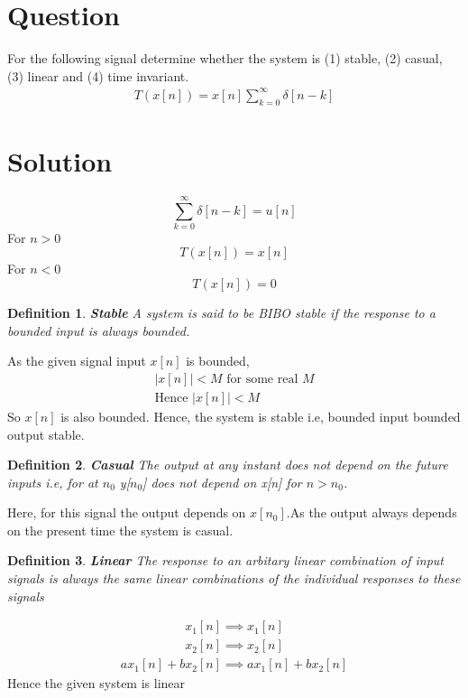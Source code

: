 \documentclass[journal,12pt,twocolumn]{IEEEtran}
\newtheorem{definition}{Definition}[section]
\begin{document}
\section{Question}
For the following signal determine whether the system is (1) stable, (2) casual, (3) linear and (4) time invariant.
\begin{align}
    T(x[n])=x[n]\sum^{\infty}_{k=0}\delta[n-k]
\end{align}
\section{Solution}
$$\sum^{\infty}_{k=0}\delta[n-k] =u[n]$$
For $n>0$ $$T(x[n])=x[n]$$
For $n<0$ $$T(x[n])=0$$
\begin{definition}{\textbf{Stable}}
A system is said to be BIBO stable if the response to a bounded input is always bounded.
\end{definition} 

As the given signal input $x[n]$ is bounded,
\begin{align}
   |x[n]| < M \text{   for some real $M$}\\
   \text{Hence  } |x[n]| < M
\end{align}
So $x[n]$ is also bounded. Hence, the system is stable i.e, bounded input bounded output stable.\\

\begin{definition}{\textbf{Casual}}
 The output at any instant does not depend on the future inputs i.e, for at $n_{0}$ y[$n_{0}$] does not depend on x[n] for $n>n_{0}$.
\end{definition}

Here, for this signal the output depends on $x[n_0]$.As the output always depends on the present time the system is casual.

\begin{definition}{\textbf{Linear}}
The response to an arbitary linear combination of input signals is always the same linear combinations of the individual responses to these signals 
\end{definition}
\begin{align}
    x_{1}[n] \implies x_{1}[n]\\
    x_{2}[n] \implies x_{2}[n]
\end{align}
\begin{align}
    ax_{1}[n]+bx_{2}[n] \implies ax_{1}[n]+bx_{2}[n]
\end{align}
Hence the given system is linear
\end{document}
